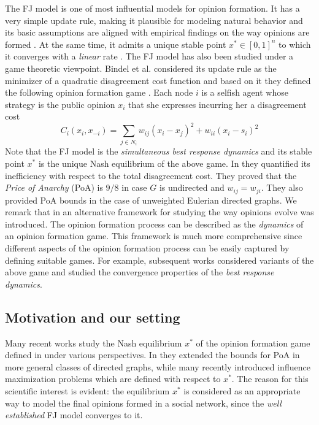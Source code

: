 The FJ model is one of most influential models for opinion formation. It has a
very simple update rule, making it plausible for modeling natural behavior and
its basic assumptions are aligned with empirical findings on the way opinions
are formed \cite{AFH05,K47}.  At the same time, it admits a unique stable
point $x^* \in [0,1]^n$ to which it converges with a \emph{linear} rate
\cite{GS14}.  The FJ model has also been studied under a game theoretic
viewpoint.  Bindel et al. considered its update rule as the minimizer of a
quadratic disagreement cost function and based on it they defined the following
opinion formation game \cite{BKO11}. Each node $i$ is a selfish agent whose
strategy is the public opinion $x_i$ that she expresses incurring her a
disagreement cost
%
\begin{equation}\label{eq:BKO_cost}
  C_i(x_i,x_{-i})= \sum_{j \in N_i}w_{ij} (x_i-x_j)^2 + w_{ii}(x_i-s_i)^2
\end{equation}
%
Note that the FJ model is the \emph{simultaneous best response dynamics} and
its stable point $x^*$ is the unique Nash equilibrium of the above game.  In
\cite{BKO11} they quantified its inefficiency with respect to the total
disagreement cost. They proved that the \emph{Price of Anarchy} (PoA) is $9/8$
in case $G$ is undirected and $w_{ij}=w_{ji}$. They also provided PoA bounds in
the case of unweighted Eulerian directed graphs.  We remark that in
\cite{BKO11} an alternative framework for studying the way opinions evolve
was introduced.  The opinion formation process can be described as the
\emph{dynamics} of an opinion formation game.  This framework is much more
comprehensive since different aspects of the opinion formation process can be
easily captured by defining suitable games.
For example, subsequent works \cite{BGM13,BFM16,EFHS17} considered variants of
the above game and studied the convergence properties of the \emph{best
  response dynamics}.

\subsection{Motivation and our setting}

Many recent works study the Nash equilibrium $x^*$ of the opinion formation
game defined in \cite{BKO11} under various perspectives. In \cite{CCL16} they
extended the bounds for PoA in more general classes of directed graphs, while
many recently introduced influence maximization problems
\cite{GTT13,AKPT18,MMT17}which are defined with respect to $x^*$.
The reason for this scientific interest is evident: the equilibrium $x^*$ is
considered as an appropriate way to model the final opinions formed in a social
network, since the \emph{well established} FJ model converges to it.

